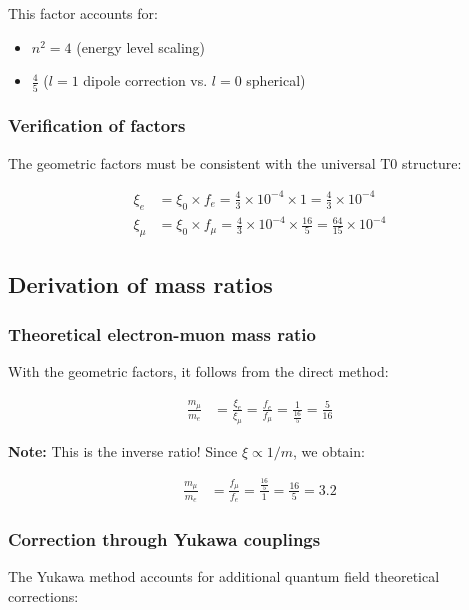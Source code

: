 \documentclass[12pt,a4paper]{report}
\begin{document}
This factor accounts for:
\begin{itemize}
	\item $n^2 = 4$ (energy level scaling)
	\item $\frac{4}{5}$ ($l=1$ dipole correction vs. $l=0$ spherical)
\end{itemize}

\subsubsection{Verification of factors}

The geometric factors must be consistent with the universal T0 structure:

\begin{align}
	\xi_e &= \xi_0 \times f_e = \frac{4}{3} \times 10^{-4} \times 1 = \frac{4}{3} \times 10^{-4}\\
	\xi_\mu &= \xi_0 \times f_\mu = \frac{4}{3} \times 10^{-4} \times \frac{16}{5} = \frac{64}{15} \times 10^{-4}
\end{align}

\subsection{Derivation of mass ratios}

\subsubsection{Theoretical electron-muon mass ratio}

With the geometric factors, it follows from the direct method:

\begin{align}
	\frac{m_\mu}{m_e} &= \frac{\xi_e}{\xi_\mu} = \frac{f_e}{f_\mu} = \frac{1}{\frac{16}{5}} = \frac{5}{16}
\end{align}

\textbf{Note:} This is the inverse ratio! Since $\xi \propto 1/m$, we obtain:

\begin{align}
	\frac{m_\mu}{m_e} &= \frac{f_\mu}{f_e} = \frac{\frac{16}{5}}{1} = \frac{16}{5} = 3.2
\end{align}

\subsubsection{Correction through Yukawa couplings}

The Yukawa method accounts for additional quantum field theoretical corrections:
\end{document}
